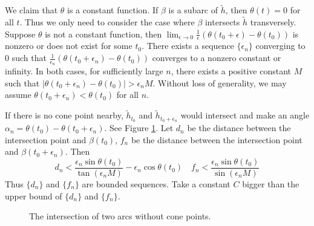 \documentclass[reqno]{amsart}
\theoremstyle{plain}
\theoremstyle{definition}
\theoremstyle{remark}
\theoremstyle{definition}
\newcommand{\?}{\textcolor{red}{?}}
\begin{document}
We claim that $\theta$ is a constant function. If $\beta$ is a subarc of $\tilde{h}$, then $\theta(t)=0$ for all $t$. Thus we only need to consider the case where $\beta$ intersects $\tilde{h}$ transversely. Suppose $\theta$ is not a constant function, then $\lim_{\epsilon\to 0} \frac{1}{\epsilon}(\theta(t_0+\epsilon)-\theta(t_0))$ is nonzero or does not exist for some $t_0$. There exists a sequence $\{\epsilon_n\}$ converging to 0 such that $\frac{1}{\epsilon_n}(\theta(t_0+\epsilon_n)-\theta(t_0))$ converges to a nonzero constant or infinity. In both cases, for sufficiently large $n$, there exists a positive constant $M$ such that $|\theta(t_0+\epsilon_n)-\theta(t_0)|>\epsilon_n M$. Without loss of generality, we may assume $\theta(t_0+\epsilon_n)<\theta(t_0)$ for all $n$.

If there is no cone point nearby, $\tilde{h}_{t_0}$ and $\tilde{h}_{t_0+\epsilon_n}$ would intersect and make an angle $\alpha_n=\theta(t_0)-\theta(t_0+\epsilon_n)$. See Figure \ref{triangle}. Let $d_n$ be the distance between the intersection point and $\beta(t_0)$, $f_n$  be the distance between the intersection point and $\beta(t_0+\epsilon_n)$. Then
\[d_n < \frac{\epsilon_n \sin \theta(t_0)}{\tan(\epsilon_nM)}-\epsilon_n\cos\theta(t_0) \quad f_n<\frac{\epsilon_n\sin \theta(t_0)}{\sin(\epsilon_nM)}
\]
Thus $\{d_n\}$ and $\{f_n\}$ are bounded sequences. Take a constant $C$ bigger than the upper bound of $\{d_n\}$ and $\{f_n\}$.
\begin{figure}[h]
    \centering
    \caption{The intersection of two arcs without cone points.}
    \label{triangle}
\end{figure}
\end{document}
